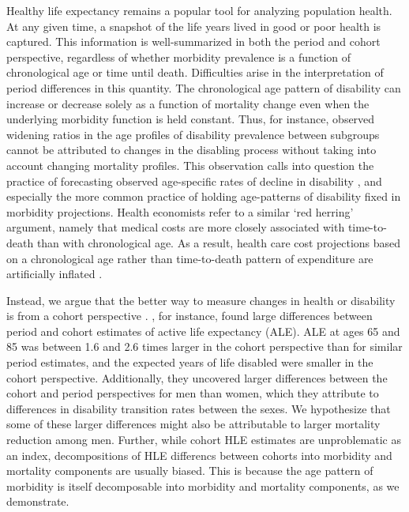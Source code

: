 \documentclass[11pt,oneside,a4paper]{article} %
\begin{document}
Healthy life expectancy remains a popular tool for analyzing population health.
At any given time, a snapshot of the life years lived in good or poor health is
captured. This information is well-summarized in both the period and
cohort perspective, regardless of whether morbidity prevalence is a function of
chronological age or time until death. Difficulties arise in the
interpretation of period differences in this quantity. The chronological age
pattern of disability can increase or decrease solely as a function of mortality
change even when the underlying morbidity function is held constant. Thus, for
instance, observed widening ratios in the age profiles of disability prevalence
between subgroups \citep{Crimmins2001} cannot be attributed to changes in the
disabling process without taking into account changing mortality profiles. This
observation calls into question the practice of forecasting observed
age-specific rates of decline in disability \citep{Manton2006,Khaw1999}, and
especially the more common practice of holding age-patterns of disability fixed
in morbidity projections.
Health economists refer to a similar `red herring' argument, namely that medical costs are more closely associated with time-to-death than with chronological age. As a result, health
care cost projections based on a chronological age rather than time-to-death
pattern of expenditure are artificially inflated \citep{Zweifel1999,Geue2014}.

Instead, we argue that the better way to measure changes in health or disability
is from a cohort perspective \citep{Manton2000,Manton2008,Christensen2013}.
\citet{Manton2000}, for instance, found large differences between period and
cohort estimates of active life expectancy (ALE). ALE at ages 65 and 85 was
between 1.6 and 2.6 times larger in the cohort perspective than for similar
period estimates, and the expected years of life disabled were smaller in the
cohort perspective.
Additionally, they uncovered larger differences between the cohort and period
perspectives for men than women, which they attribute to differences in
disability transition rates between the sexes. We hypothesize that some of these
larger differences might also be attributable to larger mortality reduction
among men. Further, while cohort HLE estimates are unproblematic as an index,
decompositions of HLE differencs between cohorts into morbidity and
mortality components are usually biased. This is because the age pattern of
morbidity is itself decomposable into morbidity and
mortality components, as we demonstrate.  
\end{document}
